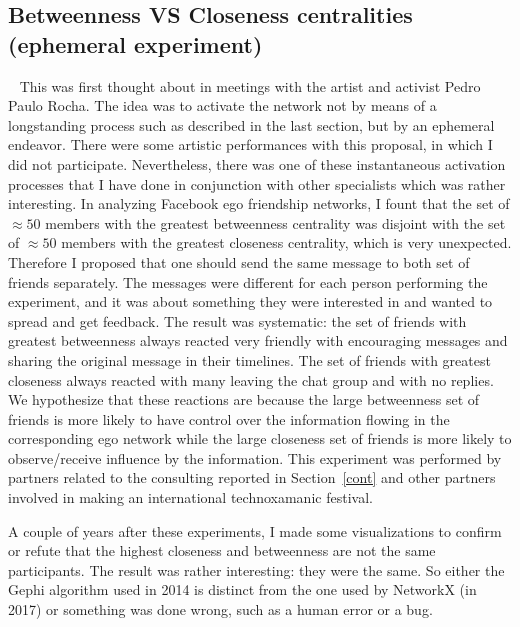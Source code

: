 \documentclass[a4paper]{article}
\begin{document}
\subsection{Betweenness VS Closeness centralities (ephemeral experiment)}~\label{eph}
This was first thought about in meetings with the artist and activist Pedro Paulo Rocha.
The idea was to activate the network not by means of a longstanding process such
as described in the last section, but by an ephemeral endeavor.
There were some artistic performances with this proposal, in which I did
not participate.
Nevertheless, there was one of these instantaneous activation processes that
I have done in conjunction with other specialists which was rather interesting.
In analyzing Facebook ego friendship networks, I fount that the set of $\approx 50$ members with
the greatest betweenness centrality was disjoint with the set of $\approx 50$ members
with the greatest closeness centrality, which is very unexpected.
Therefore I proposed that one should send the same message to both set of friends separately.
The messages were different for each person performing the experiment,
and it was about something they were interested in and wanted to spread and get feedback.
The result was systematic: the set of friends with greatest betweenness always reacted very friendly
with encouraging messages and sharing the original message in their timelines.
The set of friends with greatest closeness always reacted with many leaving the chat group
and with no replies.
We hypothesize that these reactions are because the large betweenness set of friends is more
likely to have control over the information flowing in the corresponding ego network while
the large closeness set of friends is more likely to observe/receive influence by the information.
This experiment was performed by partners related to the consulting reported in Section~\ref{cont}
and other partners involved in making an international technoxamanic festival.

A couple of years after these experiments, I made some visualizations to confirm or refute
that the highest closeness and betweenness are not the same participants.
The result was rather interesting: they were the same.
So either the Gephi algorithm used in 2014 is distinct from the one used by
NetworkX (in 2017) or something was done wrong, such as a human error or a bug.
\end{document}

